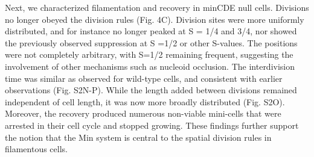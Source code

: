 Next, we characterized filamentation and recovery in minCDE null cells. Divisions no longer obeyed the division rules (Fig. 4C). Division sites were more uniformly distributed, and for instance no longer peaked at S = 1/4 and 3/4, nor showed the previously observed suppression at S =1/2 or other S-values. The positions were not completely arbitrary, with S=1/2 remaining frequent, suggesting the involvement of other mechanisms such as nucleoid occlusion. The interdivision time was similar as observed for wild-type cells, and consistent with earlier observations \cite{Donachie1996} (Fig. S2N-P). While the length added between divisions remained independent of cell length, it was now more broadly distributed (Fig. S2O). Moreover, the recovery produced numerous non-viable mini-cells \cite{Donachie1996, Adler1967} that were arrested in their cell cycle and stopped growing.  These findings further support the notion that the Min system is central to the spatial division rules in filamentous cells.

